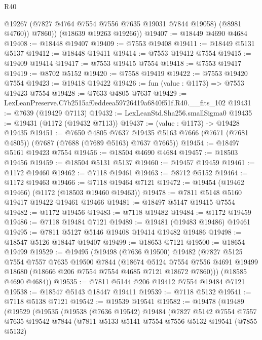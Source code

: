 \begin{lexlean}{R40}
\begin{coremodule}
            @19267
            (@7827 @4764 @7554 @7556 @7635 @19031 @7844 @19058)
            (@8981 @4760))
          @7860))
      (@18639 @19263 @19266))
@19407 := @18449 @4690 @4684
@19408 := @18448 @19407
@19409 := @7553 @19408
@19411 := @18449 @5131 @5137
@19412 := @18448 @19411
@19414 := @7553 @19412 @7554
@19415 := @19409 @19414
@19417 := @7553 @19415 @7554
@19418 := @7553 @19417
@19419 := @8702 @5152
@19420 := @7558 @19419
@19422 := @7553 @19420 @7554
@19423 := @19418 @19422
@19426 := fun (value : @1173) => @7553 @19423 @7554
@19428 := @7633 @4805 @7637
@19429 := LexLeanPreserve.C7b2515af0eddeea59726419a6840f51f.R40.__fits_102
@19431 := @7639 (@19429 @7113)
@19432 := LexLeanStd.Sha256.smallSigma0
@19435 := @19431 (@1172 (@19432 @7113))
@19437 := (value : @1173) -> @19428 @19435
@19451 := @7650
    @4805
    @7637
    @19435
    @5163
    @7666
    (@7671 (@7681 @4805))
    (@7687 (@7688 (@7689 @5163) @7637 @7665))
@19454 := @18497 @5161 @19423 @7554
@19456 := @18504 @4690 @4684
@19457 := @18503 @19456
@19459 := @18504 @5131 @5137
@19460 := @19457 @19459
@19461 := @1172 @19460
@19462 := @7118 @19461
@19463 := @8712 @5152
@19464 := @1172 @19463
@19466 := @7118 @19464 @7121
@19472 := @19454 (@19462 @19466) (@1172 (@18503 @19460 @19463))
@19478 := @7811 @5148 @5160 @19417 @19422 @19461 @19466
@19481 := @18497 @5147 @19415 @7554
@19482 := @1172 @19456
@19483 := @7118 @19482
@19484 := @1172 @19459
@19486 := @7118 @19484 @7121
@19489 := @19481 (@19483 @19486) @19461
@19495 := @7811 @5127 @5146 @19408 @19414 @19482 @19486
@19498 := @18547 @5126 @18447 @19407
@19499 := @18653 @7121
@19500 := @18654 @19499
@19529 := @19495
    (@19498
      (@7636 @19500)
      @19482
      (@7827
        @5125
        @7554
        @7557
        @7635
        @19500
        @7844
        (@18674
          @5124
          @7554
          @7556
          @4691
          @19499
          @18680
          (@18666 @206 @7554 @7554 @4685 @7121 @18672 @7860)))
      (@18585 @4690 @4684))
@19535 := @7811 @5144 @206 @19412 @7554 @19484 @7121
@19538 := @18547 @5143 @18447 @19411
@19539 := @7118 @5132
@19541 := @7118 @5138 @7121
@19542 := @19539 @19541
@19582 := @19478
    (@19489
      (@19529
        (@19535
          (@19538
            (@7636 @19542)
            @19484
            (@7827
              @5142
              @7554
              @7557
              @7635
              @19542
              @7844
              (@7811
                @5133
                @5141
                @7554
                @7556
                @5132
                @19541
                (@7855 @5132)

\end{coremodule}
\end{lexlean}
